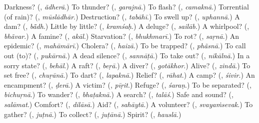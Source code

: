 \begin{tcolorbox}[breakable,colback=teal!4,colframe=teal!35!black,title={Before you move on}]
Darkness? (\textbf{}, \emph{ãdherā}.) To thunder? (\textbf{}, \emph{garajnā}.) To flash? (\textbf{}, \emph{camaknā}.) Torrential (of rain)? (\textbf{}, \emph{mūslādhār}.) Destruction? (\textbf{}, \emph{tabāhī}.) To swell up? (\textbf{}, \emph{uphannā}.) A dam? (\textbf{}, \emph{bā̃dh}.) Little by little? (\textbf{}, \emph{kramśaḥ}.) A deluge? (\textbf{}, \emph{sailāb}.) A whirlpool? (\textbf{}, \emph{bhãvar}.) A famine? (\textbf{}, \emph{akāl}.) Starvation? (\textbf{}, \emph{bhukhmarī}.) To rot? (\textbf{}, \emph{saṛnā}.) An epidemic? (\textbf{}, \emph{mahāmārī}.) Cholera? (\textbf{}, \emph{haizā}.) To be trapped? (\textbf{}, \emph{phãsnā}.) To call out (to)? (\textbf{}, \emph{pukārnā}.) A dead silence? (\textbf{}, \emph{sannāṭā}.) To take out? (\textbf{}, \emph{nikālnā}.) In a sorry state? (\textbf{}, \emph{behāl}.) A raft? (\textbf{}, \emph{beṛā}.) A diver? (\textbf{}, \emph{gotākhor}.) Alive? (\textbf{}, \emph{zindā}.) To set free? (\textbf{}, \emph{chuṛānā}.) To dart? (\textbf{}, \emph{lapaknā}.) Relief? (\textbf{}, \emph{rāhat}.) A camp? (\textbf{}, \emph{śivir}.) An encampment? (\textbf{}, \emph{ḍerā}.) A victim? (\textbf{}, \emph{pīṛit}.) Refuge? (\textbf{}, \emph{śaraṇ}.) To be separated? (\textbf{}, \emph{bichuṛnā}.) To wander? (\textbf{}, \emph{bhaṭaknā}.) A search? (\textbf{}, \emph{talāś}.) Safe and sound? (\textbf{}, \emph{salāmat}.) Comfort? (\textbf{}, \emph{dilāsā}.) Aid? (\textbf{}, \emph{sahāytā}.) A volunteer? (\textbf{}, \emph{svayaṁsevak}.) To gather? (\textbf{}, \emph{juṭnā}.) To collect? (\textbf{}, \emph{juṭānā}.) Spirit? (\textbf{}, \emph{hauslā}.)
\end{tcolorbox}
